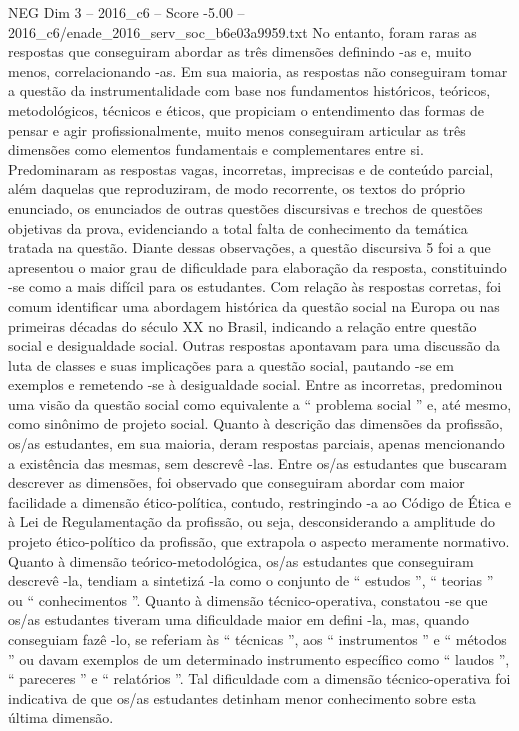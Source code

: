 \begin{textsample}{NEG Dim 3 – 2016\_c6 – Score -5.00 – 2016\_c6/enade\_2016\_serv\_soc\_b6e03a9959.txt}
No entanto, foram raras as respostas que conseguiram abordar as três dimensões definindo -as e, muito menos, correlacionando -as.
Em sua maioria, as respostas não conseguiram tomar a questão da instrumentalidade com base nos fundamentos históricos, teóricos, metodológicos, técnicos e éticos, que propiciam o entendimento das formas de pensar e agir profissionalmente, muito menos conseguiram articular as três dimensões como elementos fundamentais e complementares entre si.
Predominaram as respostas vagas, incorretas, imprecisas e de conteúdo parcial, além daquelas que reproduziram, de modo recorrente, os textos do próprio enunciado, os enunciados de outras questões discursivas e trechos de questões objetivas da prova, evidenciando a total falta de conhecimento da temática tratada na questão.
Diante dessas observações, a questão discursiva 5 foi a que apresentou o maior grau de dificuldade para elaboração da resposta, constituindo -se como a mais difícil para os estudantes.
Com relação às respostas corretas, foi comum identificar uma abordagem histórica da questão social na Europa ou nas primeiras décadas do século XX no Brasil, indicando a relação entre questão social e desigualdade social.
Outras respostas apontavam para uma discussão da luta de classes e suas implicações para a questão social, pautando -se em exemplos e remetendo -se à desigualdade social.
Entre as incorretas, predominou uma visão da questão social como equivalente a “ problema social ” e, até mesmo, como sinônimo de projeto social.
Quanto à descrição das dimensões da profissão, os/as estudantes, em sua maioria, deram respostas parciais, apenas mencionando a existência das mesmas, sem descrevê -las.
Entre os/as estudantes que buscaram descrever as dimensões, foi observado que conseguiram abordar com maior facilidade a dimensão ético-política, contudo, restringindo -a ao Código de Ética e à Lei de Regulamentação da profissão, ou seja, desconsiderando a amplitude do projeto ético-político da profissão, que extrapola o aspecto meramente normativo.
Quanto à dimensão teórico-metodológica, os/as estudantes que conseguiram descrevê -la, tendiam a sintetizá -la como o conjunto de “ estudos ”, “ teorias ” ou “ conhecimentos ”.
Quanto à dimensão técnico-operativa, constatou -se que os/as estudantes tiveram uma dificuldade maior em defini -la, mas, quando conseguiam fazê -lo, se referiam às “ técnicas ”, aos “ instrumentos ” e “ métodos ” ou davam exemplos de um determinado instrumento específico como “ laudos ”, “ pareceres ” e “ relatórios ”.
Tal dificuldade com a dimensão técnico-operativa foi indicativa de que os/as estudantes detinham menor conhecimento sobre esta última dimensão.

\end{textsample}
